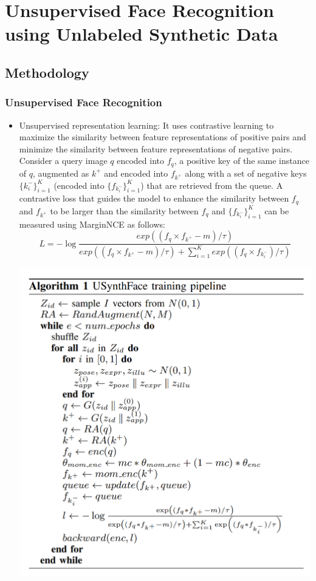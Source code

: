 \documentclass[12pt]{article}
\begin{document}
\section{Unsupervised Face Recognition using Unlabeled Synthetic Data}
\subsection{Methodology}
\subsubsection{Unsupervised Face Recognition}
\begin{itemize}
  \item Unsupervised representation learning: It uses contrastive learning to maximize the similarity between feature representations of positive pairs and minimize the similarity between feature representations of negative
  pairs. Consider a query image $q$ encoded into $f_q$, a positive key
  of the same instance of $q$, augmented as $k^+$ and encoded into
  $f_{k^+}$ along with a set of negative keys $\{k^-_i\}^K_{i=1}$ (encoded into
  $\{f_{k^-_i}\}^K_{i=1}$) that are retrieved from the queue. A contrastive
  loss that guides the model to enhance the similarity between $f_q$ and $f_{k^+}$ to be larger than the similarity between $f_q$
  and $\{f_{k^-_i}\}^K_{i=1}$ can be measured using MarginNCE as
  follows:
  \[L=-\log\dfrac{exp((f_q\times f_{k^+}-m)/\tau)}{exp((f_q\times f_{k^+}-m)/\tau)+\sum_{i=1}^{K}exp((f_q\times f_{k^-_i})/\tau)}\]
  \begin{center}
    \includegraphics[scale = 0.8]{img12.png}

\end{center}
\end{itemize}
\end{document}
